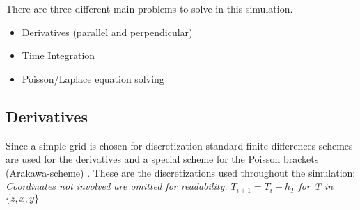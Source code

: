 \documentclass[master.tex]{subfiles}
\begin{document}
There are three different main problems to solve in this simulation.
\begin{itemize}
    \item Derivatives (parallel and perpendicular)
    \item Time Integration
    \item Poisson/Laplace equation solving
\end{itemize}

\subsection{Derivatives}
Since a simple grid is chosen for discretization standard finite-differences schemes are used for the derivatives and a special scheme for the Poisson brackets (Arakawa-scheme) \cite{arakawa}.\newline
These are the discretizations used throughout the simulation:\newline
\textit{Coordinates not involved are omitted for readability. $T_{i + 1} = T_i + h_T$ for T in $\{z, x, y\}$}
\end{document}
